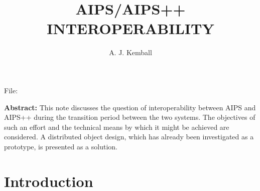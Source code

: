 \newcommand{\tbt}[4]{\left(\begin{array}{cc}#1 & #2\\ #3 & #4 \end{array}\right)}
\newcommand{\ddp}[2]{\frac {\partial #1}{\partial #2}}
\newcommand{\bast}{{\null}}
\newcommand{\lr}{\Leftrightarrow}


\title{AIPS/AIPS++ INTEROPERABILITY}
\author{A. J. Kemball}
\maketitle

\hspace*{\fill} {\tiny File: \thisfile}   %

\vspace{0.1cm}
\begin{center}\parbox{0.9\textwidth}{{\bf Abstract:}
  This note discusses the question of interoperability between AIPS and
AIPS++ during the transition period between the two systems. The
objectives of such an effort and the technical means by which it might
be achieved are considered.  A distributed object design, which has
already been investigated as a prototype, is presented as a solution.
  }\end{center}


\section{Introduction}

